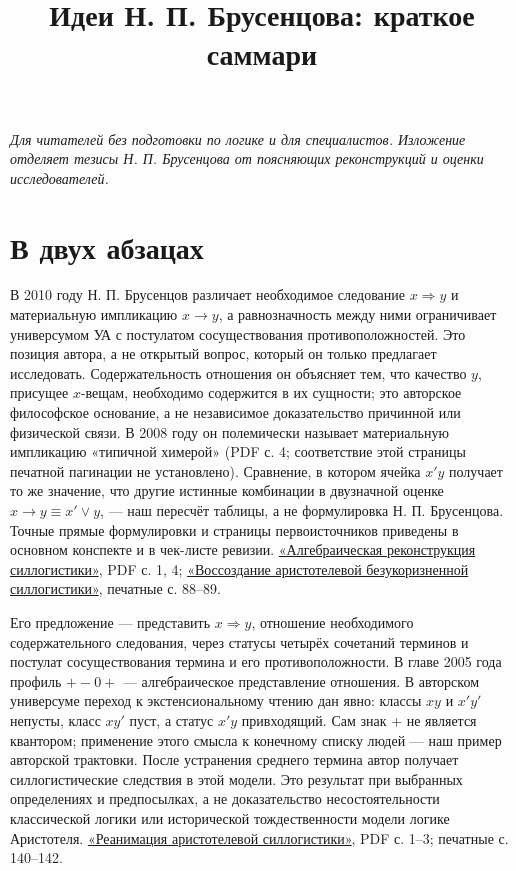 \documentclass[12pt,a4paper]{article}
\title{Идеи Н. П. Брусенцова: краткое саммари}
\author{}
\date{}
\begin{document}
\maketitle

\emph{Для читателей без подготовки по логике и для специалистов. Изложение отделяет тезисы Н. П. Брусенцова от поясняющих реконструкций и оценки исследователей.}

\section{В двух абзацах}

В 2010 году Н. П. Брусенцов различает необходимое следование \(x\Rightarrow y\) и материальную импликацию \(x\to y\), а равнозначность между ними ограничивает универсумом \(\text{УА}\) с постулатом сосуществования противоположностей. Это позиция автора, а не открытый вопрос, который он только предлагает исследовать. Содержательность отношения он объясняет тем, что качество \(y\), присущее \(x\)-вещам, необходимо содержится в их сущности; это авторское философское основание, а не независимое доказательство причинной или физической связи. В 2008 году он полемически называет материальную импликацию «типичной химерой» (PDF с. 4; соответствие этой страницы печатной пагинации не установлено). Сравнение, в котором ячейка \(x'y\) получает то же значение, что другие истинные комбинации в двузначной оценке \(x\to y\equiv x'\lor y\), — наш пересчёт таблицы, а не формулировка Н. П. Брусенцова. Точные прямые формулировки и страницы первоисточников приведены в основном конспекте и в чек-листе ревизии. \href{https://ternarycomp.cs.msu.ru/Papers/Alrek.pdf}{«Алгебраическая реконструкция силлогистики»}, PDF с. 1, 4; \href{https://ternarycomp.cs.msu.ru/Papers/brusentsov_sborn2010_2.pdf}{«Воссоздание аристотелевой безукоризненной силлогистики»}, печатные с. 88–89.

Его предложение — представить \(x\Rightarrow y\), отношение необходимого содержательного следования, через статусы четырёх сочетаний терминов и постулат сосуществования термина и его противоположности. В главе 2005 года профиль \(+-0+\) — алгебраическое представление отношения. В авторском универсуме переход к экстенсиональному чтению дан явно: классы \(xy\) и \(x'y'\) непусты, класс \(xy'\) пуст, а статус \(x'y\) привходящий. Сам знак \(+\) не является квантором; применение этого смысла к конечному списку людей — наш пример авторской трактовки. После устранения среднего термина автор получает силлогистические следствия в этой модели. Это результат при выбранных определениях и предпосылках, а не доказательство несостоятельности классической логики или исторической тождественности модели логике Аристотеля. \href{https://ternarycomp.cs.msu.ru/Papers/Rea.pdf}{«Реанимация аристотелевой силлогистики»}, PDF с. 1–3; печатные с. 140–142.
\end{document}
